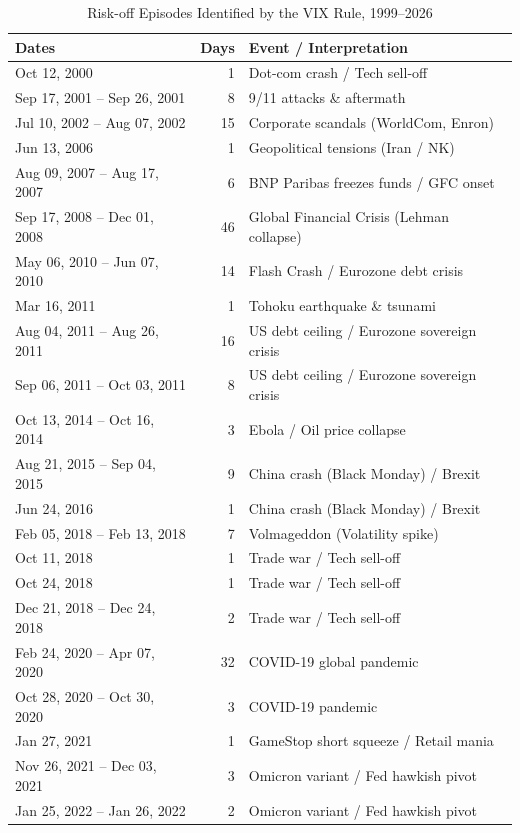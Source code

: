\begin{table}[H]
  \centering
  \caption{Risk-off Episodes Identified by the VIX Rule, 1999--2026}
  \label{tab:episodes}
  \small
  \begin{tabular}{l r l}
    \toprule
    Dates & Days & Event / Interpretation \\
    \midrule
Oct 12, 2000 & 1 & Dot-com crash / Tech sell-off \\
Sep 17, 2001 -- Sep 26, 2001 & 8 & 9/11 attacks \& aftermath \\
Jul 10, 2002 -- Aug 07, 2002 & 15 & Corporate scandals (WorldCom, Enron) \\
Jun 13, 2006 & 1 & Geopolitical tensions (Iran / NK) \\
Aug 09, 2007 -- Aug 17, 2007 & 6 & BNP Paribas freezes funds / GFC onset \\
Sep 17, 2008 -- Dec 01, 2008 & 46 & Global Financial Crisis (Lehman collapse) \\
May 06, 2010 -- Jun 07, 2010 & 14 & Flash Crash / Eurozone debt crisis \\
Mar 16, 2011 & 1 & Tohoku earthquake \& tsunami \\
Aug 04, 2011 -- Aug 26, 2011 & 16 & US debt ceiling / Eurozone sovereign crisis \\
Sep 06, 2011 -- Oct 03, 2011 & 8 & US debt ceiling / Eurozone sovereign crisis \\
Oct 13, 2014 -- Oct 16, 2014 & 3 & Ebola / Oil price collapse \\
Aug 21, 2015 -- Sep 04, 2015 & 9 & China crash (Black Monday) / Brexit \\
Jun 24, 2016 & 1 & China crash (Black Monday) / Brexit \\
Feb 05, 2018 -- Feb 13, 2018 & 7 & Volmageddon (Volatility spike) \\
Oct 11, 2018 & 1 & Trade war / Tech sell-off \\
Oct 24, 2018 & 1 & Trade war / Tech sell-off \\
Dec 21, 2018 -- Dec 24, 2018 & 2 & Trade war / Tech sell-off \\
Feb 24, 2020 -- Apr 07, 2020 & 32 & COVID-19 global pandemic \\
Oct 28, 2020 -- Oct 30, 2020 & 3 & COVID-19 pandemic \\
Jan 27, 2021 & 1 & GameStop short squeeze / Retail mania \\
Nov 26, 2021 -- Dec 03, 2021 & 3 & Omicron variant / Fed hawkish pivot \\
Jan 25, 2022 -- Jan 26, 2022 & 2 & Omicron variant / Fed hawkish pivot \\

\end{tabular}
\end{table}
